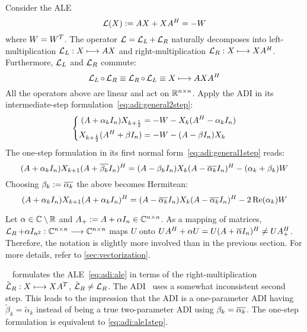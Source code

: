 Consider the \ac{ALE}
\begin{equation}
\label{eq:adi:ale}
  \operatorname{\mathcal L}(X) := AX + XA^H = -W
\end{equation}
where $W = W^T$.
The \Lyapunov operator $\operatorname{\mathcal L} = \operatorname{\mathcal L}_L + \operatorname{\mathcal L}_R$ naturally decomposes into
left-multiplication $\operatorname{\mathcal L}_L : X \longmapsto AX$ and
right-multiplication $\operatorname{\mathcal L}_R : X \longmapsto XA^H$.
Furthermore, $\operatorname{\mathcal L}_L$ and $\operatorname{\mathcal L}_R$ commute:
\begin{equation*}
  \operatorname{\mathcal L}_L \circ \operatorname{\mathcal L}_R \equiv \operatorname{\mathcal L}_R \circ \operatorname{\mathcal L}_L \equiv X \longmapsto AXA^H
\end{equation*}
All the operators above are linear and act on $\mathbb{R}^{n\times n}$.
Apply the \ac{ADI} in its intermediate-step formulation~\eqref{eq:adi:general2step}:
\begin{equation}
  \left\{
  \begin{aligned}
    (A + \alpha_k I_n) X_{k+\frac{1}{2}} &= -W - X_k (A^H - \alpha_k I_n) \\
    X_{k+\frac{1}{2}} (A^H + \beta I_n) &= -W - (A - \beta I_n) X_k
  \end{aligned}
  \right.
\end{equation}
The one-step formulation in its first normal form~\eqref{eq:adi:general1step} reads:
\begin{equation}
  (A + \alpha_k I_n)
  X_{k+1}
  (A + \conj{\beta_k} I_n)^\HT
  =
  (A - \beta_k I_n)
  X_k
  (A - \conj{\alpha_k} I_n)^\HT
  - (\alpha_k + \beta_k)
  W
\end{equation}
Choosing $\beta_k := \conj{\alpha_k}$
the above becomes Hermitean:
\begin{equation}
\label{eq:adi:ale1step}
  (A + \alpha_k I_n)
  X_{k+1}
  (A + \alpha_k I_n)^\HT
  =
  (A - \conj{\alpha_k} I_n)
  X_k
  (A - \conj{\alpha_k} I_n)^\HT
  - 2\Re(\alpha_k)
  W
\end{equation}

\begin{remark}
  Let $\alpha\in\mathbb{C}\setminus\mathbb{R}$ and $A_+ := A+\alpha I_n \in\mathbb{C}^{n\times n}$.
  As a mapping of matrices,
  $\operatorname{\mathcal L}_R + \alpha I_{n^2} : \mathbb{C}^{n\times n} \longrightarrow \mathbb{C}^{n\times n}$ maps $U$ onto
  $
    U A^\HT + \alpha U =
    U(A+\conj{\alpha} I_n)^\HT \neq
    U A_+^\HT
  $.
  Therefore, the notation is slightly more involved than in the previous section.
  For more details, refer to \autoref{sec:vectorization}.
\end{remark}

\begin{remark}
  \citeauthor{Lang2017}~\cite{Lang2017} formulates the \ac{ALE}~\eqref{eq:adi:ale} in terms of the
  right-multiplication $\tilde {\operatorname{\mathcal L}}_R :X \longmapsto XA^T$, $\tilde {\operatorname{\mathcal L}}_R \neq \operatorname{\mathcal L}_R$.
  The ADI~\cite[Equation~(2.23)]{Lang2017} uses a somewhat inconsistent second step.
  This leads to the impression that the ADI is a one-parameter ADI having $\tilde\beta_k = \tilde\alpha_k$
  instead of being a true two-parameter ADI using $\beta_k = \conj{\alpha_k}$.
  The one-step formulation \cite[Equation~(2.24)]{Lang2017} is equivalent to \eqref{eq:adi:ale1step}.
\end{remark}

